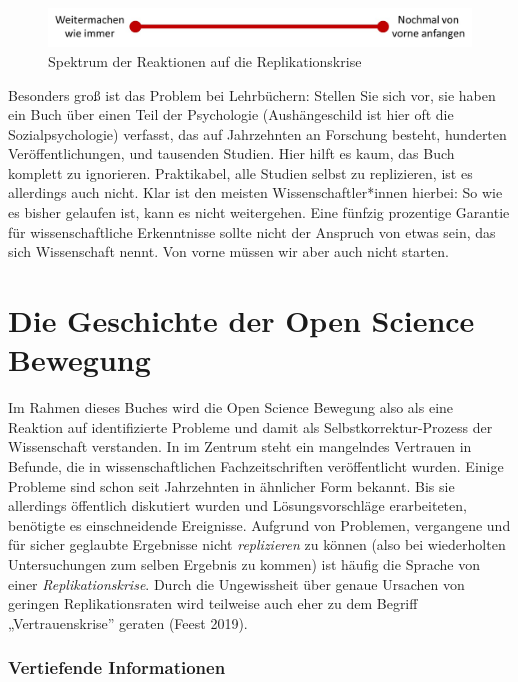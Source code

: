 \documentclass[
  letterpaper,
  DIV=11,
  numbers=noendperiod]{scrreprt}
\begin{document}
\begin{figure}[H]

{\centering \includegraphics{images/spektrumreaktionen.jpg}

}

\caption{Spektrum der Reaktionen auf die Replikationskrise}

\end{figure}%

Besonders groß ist das Problem bei Lehrbüchern: Stellen Sie sich vor,
sie haben ein Buch über einen Teil der Psychologie (Aushängeschild ist
hier oft die Sozialpsychologie) verfasst, das auf Jahrzehnten an
Forschung besteht, hunderten Veröffentlichungen, und tausenden Studien.
Hier hilft es kaum, das Buch komplett zu ignorieren. Praktikabel, alle
Studien selbst zu replizieren, ist es allerdings auch nicht. Klar ist
den meisten Wissenschaftler*innen hierbei: So wie es bisher gelaufen
ist, kann es nicht weitergehen. Eine fünfzig prozentige Garantie für
wissenschaftliche Erkenntnisse sollte nicht der Anspruch von etwas sein,
das sich Wissenschaft nennt. Von vorne müssen wir aber auch nicht
starten.

\part{Die Geschichte der Open Science Bewegung}

Im Rahmen dieses Buches wird die Open Science Bewegung also als eine
Reaktion auf identifizierte Probleme und damit als
Selbstkorrektur-Prozess der Wissenschaft verstanden. In im Zentrum steht
ein mangelndes Vertrauen in Befunde, die in wissenschaftlichen
Fachzeitschriften veröffentlicht wurden. Einige Probleme sind schon seit
Jahrzehnten in ähnlicher Form bekannt. Bis sie allerdings öffentlich
diskutiert wurden und Lösungsvorschläge erarbeiteten, benötigte es
einschneidende Ereignisse. Aufgrund von Problemen, vergangene und für
sicher geglaubte Ergebnisse nicht \emph{replizieren} zu können (also bei
wiederholten Untersuchungen zum selben Ergebnis zu kommen) ist häufig
die Sprache von einer \emph{Replikationskrise}. Durch die Ungewissheit
über genaue Ursachen von geringen Replikationsraten wird teilweise auch
eher zu dem Begriff „Vertrauenskrise'' geraten (Feest 2019).

\section*{Vertiefende Informationen}\label{vertiefende-informationen}
\end{document}

